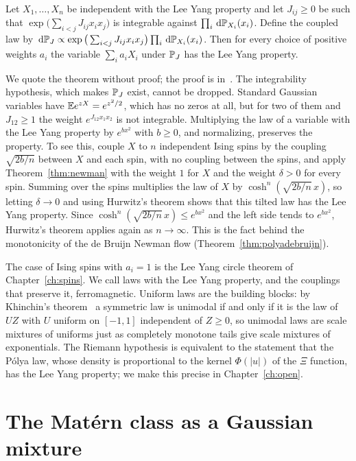 \begin{theorem}
\label{thm:newman}
Let $X_1,\dots,X_n$ be independent with the Lee Yang property and let $J_{ij}\geq0$ be such that $\exp\big(\sum_{i<j}J_{ij}x_ix_j\big)$ is integrable against $\prod_i\dd\P_{X_i}(x_i)$. Define the coupled law by $\dd\P_J\propto\exp\big(\sum_{i<j}J_{ij}x_ix_j\big)\prod_i\dd\P_{X_i}(x_i)$. Then for every choice of positive weights $a_i$ the variable $\sum_ia_iX_i$ under $\P_J$ has the Lee Yang property.
\end{theorem}

We quote the theorem without proof; the proof is in~\cite{newman1974}. The integrability hypothesis, which makes $\P_J$ exist, cannot be dropped. Standard Gaussian variables have $\E e^{zX} = e^{z^2/2}$, which has no zeros at all, but for two of them and $J_{12}\geq1$ the weight $e^{J_{12}x_1x_2}$ is not integrable. Multiplying the law of a variable with the Lee Yang property by $e^{bx^2}$ with $b\geq0$, and normalizing, preserves the property. To see this, couple $X$ to $n$ independent Ising spins by the coupling $\sqrt{2b/n}$ between $X$ and each spin, with no coupling between the spins, and apply Theorem~\ref{thm:newman} with the weight $1$ for $X$ and the weight $\delta>0$ for every spin. Summing over the spins multiplies the law of $X$ by $\cosh^n(\sqrt{2b/n}\,x)$, so letting $\delta\to0$ and using Hurwitz's theorem shows that this tilted law has the Lee Yang property. Since $\cosh^n(\sqrt{2b/n}\,x)\leq e^{bx^2}$ and the left side tends to $e^{bx^2}$, Hurwitz's theorem applies again as $n\to\infty$. This is the fact behind the monotonicity of the de Bruijn Newman flow (Theorem~\ref{thm:polyadebruijn}).

The case of Ising spins with $a_i = 1$ is the Lee Yang circle theorem of Chapter~\ref{ch:spins}. We call laws with the Lee Yang property, and the couplings that preserve it, ferromagnetic. Uniform laws are the building blocks: by Khinchin's theorem~\cite{khinchin1938} a symmetric law is unimodal if and only if it is the law of $UZ$ with $U$ uniform on $[-1,1]$ independent of $Z\geq0$, so unimodal laws are scale mixtures of uniforms just as completely monotone tails give scale mixtures of exponentials. The Riemann hypothesis is equivalent to the statement that the P\'olya law, whose density is proportional to the kernel $\Phi(|u|)$ of the $\Xi$ function, has the Lee Yang property; we make this precise in Chapter~\ref{ch:open}.

\section{The Mat\'ern class as a Gaussian mixture}

